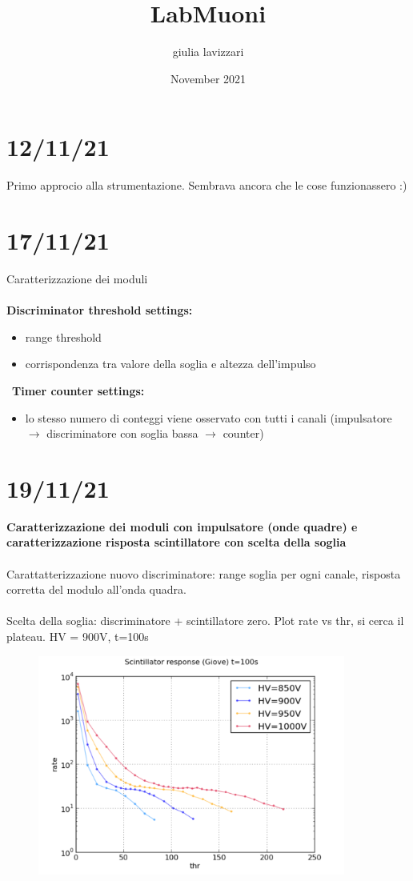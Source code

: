 \documentclass{article}
\title{LabMuoni}
\author{giulia lavizzari}
\date{November 2021}
\begin{document}
\maketitle

\section{12/11/21}
Primo approcio alla strumentazione. Sembrava ancora che le cose funzionassero :)

\section{17/11/21}
Caratterizzazione dei moduli
\\\\\textbf{Discriminator threshold settings:}
\begin{itemize}
    \item range threshold
    \item corrispondenza tra valore della soglia e altezza dell'impulso
\end{itemize}\
\textbf{Timer counter settings:}
\begin{itemize}
    \item lo stesso numero di conteggi viene osservato con tutti i canali (impulsatore $\rightarrow$ discriminatore con soglia bassa $\rightarrow$ counter)
\end{itemize}


\section{19/11/21}
\textbf{Caratterizzazione dei moduli con impulsatore (onde quadre) e caratterizzazione risposta scintillatore con scelta della soglia}\\\\
Carattatterizzazione nuovo discriminatore: range soglia per ogni canale, risposta corretta del modulo all'onda quadra.\\\\
Scelta della soglia: discriminatore + scintillatore zero. Plot rate vs thr, si cerca il plateau. HV = 900V, t=100s
\begin{figure}
    \centering
    \includegraphics[width=0.9\textwidth]{dati1.PNG}
\end{figure}
\end{document}
